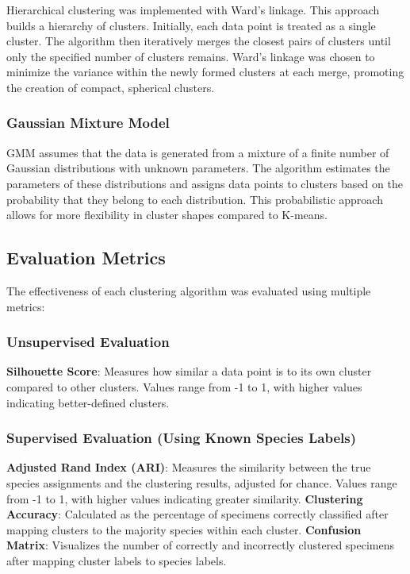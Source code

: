 \documentclass[a4paper,12pt]{report}
\begin{document}
Hierarchical clustering was implemented with Ward's linkage. This approach builds a hierarchy of clusters. Initially, each data point is treated as a single cluster.  The algorithm then iteratively merges the closest pairs of clusters until only the specified number of clusters remains. Ward's linkage was chosen to minimize the variance within the newly formed clusters at each merge, promoting the creation of compact, spherical clusters.

\subsubsection{Gaussian Mixture Model}

GMM assumes that the data is generated from a mixture of a finite number of Gaussian distributions with unknown parameters. The algorithm estimates the parameters of these distributions and assigns data points to clusters based on the probability that they belong to each distribution. This probabilistic approach allows for more flexibility in cluster shapes compared to K-means.

\subsection{Evaluation Metrics}
The effectiveness of each clustering algorithm was evaluated using multiple metrics:

\subsubsection{Unsupervised Evaluation}
\textbf{Silhouette Score}: Measures how similar a data point is to its own cluster compared to other clusters. Values range from -1 to 1, with higher values indicating better-defined clusters.

\subsubsection{Supervised Evaluation (Using Known Species Labels)}
\textbf{Adjusted Rand Index (ARI)}: Measures the similarity between the true species assignments and the clustering results, adjusted for chance. Values range from -1 to 1, with higher values indicating greater similarity.
\textbf{Clustering Accuracy}: Calculated as the percentage of specimens correctly classified after mapping clusters to the majority species within each cluster.
\textbf{Confusion Matrix}: Visualizes the number of correctly and incorrectly clustered specimens after mapping cluster labels to species labels.
\end{document}
